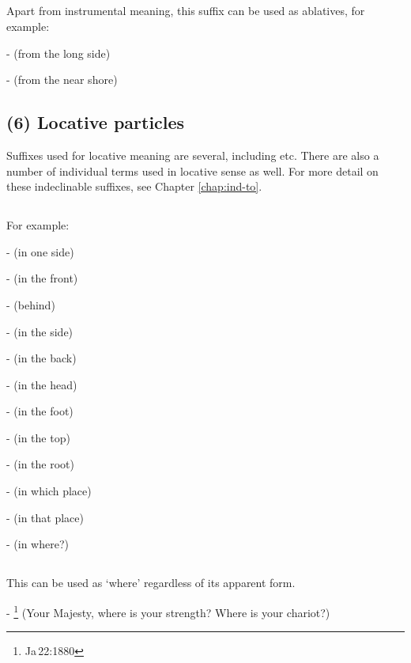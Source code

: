 \subsection*{}\label{nip:so2}
Apart from instrumental meaning, this suffix can be used as ablatives, for example:\par
-  (from the long side) \par
-  (from the near shore) \par

\subsection*{(6) Locative particles}

Suffixes used for locative meaning are several, including  etc. There are also a number of individual terms used in locative sense as well. For more detail on these indeclinable suffixes, see Chapter \ref{chap:ind-to}.\par

\subsection*{}\label{nip:to3}
For example:\par
-  (in one side) \par
-  (in the front) \par
-  (behind) \par
-  (in the side) \par
-  (in the back) \par
-  (in the head) \par
-  (in the foot) \par
-  (in the top) \par
-  (in the root) \par
-  (in which place) \par
-  (in that place) \par
-  (in where?) \par

\subsection*{}\label{nip:ko}
This can be used as `where' regardless of its apparent form.\par
- \footnote{Ja\,22:1880} (Your Majesty, where is your strength? Where is your chariot?) \par

